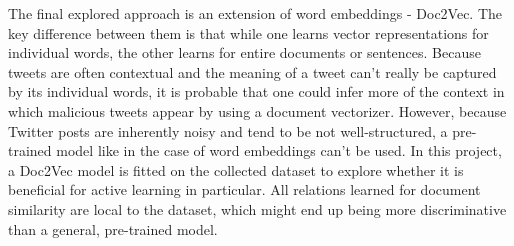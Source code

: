 \documentclass[a4paper,12pt]{article}
\begin{document}
The final explored approach is an extension of word embeddings - Doc2Vec. The key difference between them is that while one learns vector representations for individual words, the other learns for entire documents or sentences. Because tweets are often contextual and the meaning of a tweet can't really be captured by its individual words, it is probable that one could infer more of the context in which malicious tweets appear by using a document vectorizer. However, because Twitter posts are inherently noisy and tend to be not well-structured, a pre-trained model like in the case of word embeddings can't be used. In this project, a Doc2Vec model is fitted on the collected dataset to explore whether it is beneficial for active learning in particular. All relations learned for document similarity are local to the dataset, which might end up being more discriminative than a general, pre-trained model.
\end{document}
